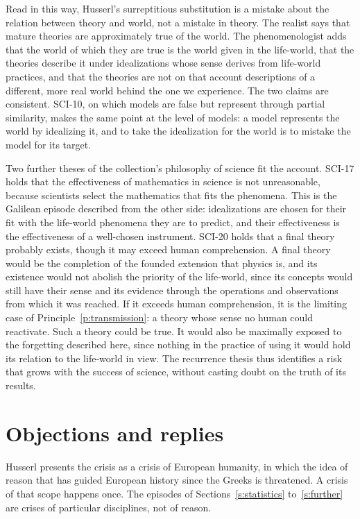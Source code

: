 \documentclass{situationist-preprint}
\begin{document}
Read in this way, Husserl's surreptitious substitution is a mistake about the relation between theory and world, not a mistake in theory. The realist says that mature theories are approximately true of the world. The phenomenologist adds that the world of which they are true is the world given in the life-world, that the theories describe it under idealizations whose sense derives from life-world practices, and that the theories are not on that account descriptions of a different, more real world behind the one we experience. The two claims are consistent. SCI-10, on which models are false but represent through partial similarity, makes the same point at the level of models: a model represents the world by idealizing it, and to take the idealization for the world is to mistake the model for its target.

Two further theses of the collection's philosophy of science fit the account. SCI-17 holds that the effectiveness of mathematics in science is not unreasonable, because scientists select the mathematics that fits the phenomena. This is the Galilean episode described from the other side: idealizations are chosen for their fit with the life-world phenomena they are to predict, and their effectiveness is the effectiveness of a well-chosen instrument. SCI-20 holds that a final theory probably exists, though it may exceed human comprehension. A final theory would be the completion of the founded extension that physics is, and its existence would not abolish the priority of the life-world, since its concepts would still have their sense and its evidence through the operations and observations from which it was reached. If it exceeds human comprehension, it is the limiting case of Principle~\ref{p:transmission}: a theory whose sense no human could reactivate. Such a theory could be true. It would also be maximally exposed to the forgetting described here, since nothing in the practice of using it would hold its relation to the life-world in view. The recurrence thesis thus identifies a risk that grows with the success of science, without casting doubt on the truth of its results.

\section{Objections and replies}

\begin{objection}
Husserl presents the crisis as a crisis of European humanity, in which the idea of reason that has guided European history since the Greeks is threatened. A crisis of that scope happens once. The episodes of Sections~\ref{s:statistics} to~\ref{s:further} are crises of particular disciplines, not of reason.
\end{objection}
\end{document}
